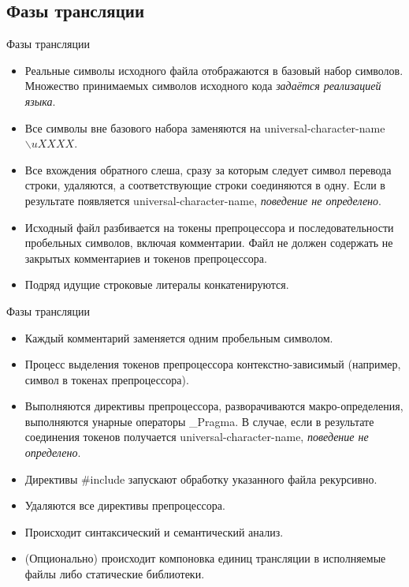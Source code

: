     \subsection{Фазы трансляции}
    \begin{frame}{Фазы трансляции}
        \begin{itemize}
            \item Реальные символы исходного файла отображаются в базовый набор символов.
                Множество принимаемых символов исходного кода \textit{задаётся реализацией языка}.
            \item Все символы вне базового набора заменяются на universal-character-name $\backslash{uXXXX}$.
            \item Все вхождения обратного слеша, сразу за которым следует символ перевода строки,
                удаляются, а соответствующие строки соединяются в одну. Если в результате появляется
                universal-character-name, \textit{поведение не определено}.
            \item Исходный файл разбивается на токены препроцессора и последовательности
                пробельных символов, включая комментарии. Файл не должен содержать не закрытых комментариев и
                токенов препроцессора.
            \item Подряд идущие строковые литералы конкатенируются.
        \end{itemize}
    \end{frame}
    \begin{frame}{Фазы трансляции}
        \begin{itemize}
            \item Каждый комментарий заменяется одним пробельным символом.
            \item Процесс выделения токенов препроцессора контекстно-зависимый (например, символ в токенах препроцессора).
            \item Выполняются директивы препроцессора, разворачиваются макро-определения, выполняются унарные операторы \_Pragma.
                В случае, если в результате соединения токенов получается universal-character-name, \textit{поведение не определено}.
            \item Директивы \#include запускают обработку указанного файла рекурсивно.
            \item Удаляются все директивы препроцессора.
            \item Происходит синтаксический и семантический анализ.
            \item (Опционально) происходит компоновка единиц трансляции в исполняемые файлы либо статические библиотеки.
        \end{itemize}
    \end{frame}
